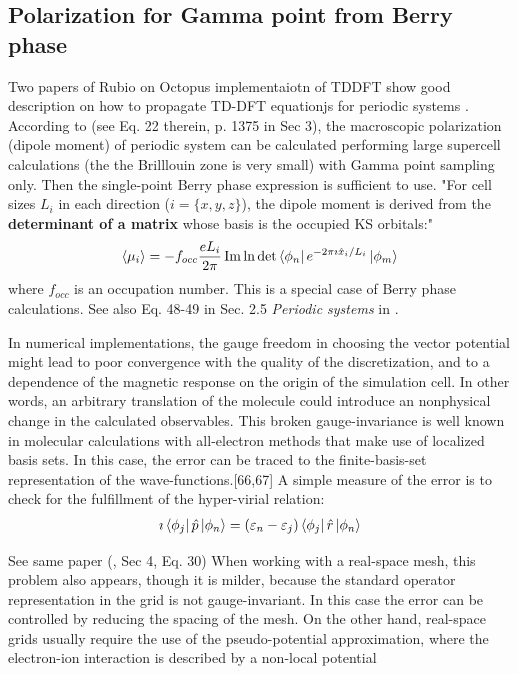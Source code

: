 \documentclass[11pt]{article}
\begin{document}
\subsection{ Polarization for Gamma point from Berry phase }

Two papers of Rubio  on Octopus implementaiotn of TDDFT show good description on how to propagate TD-DFT equationjs for periodic systems \cite{octopus-rt-tddft-PCCP-2015,octopus-rt-tddft-JCP-2020}.
According to  \cite{octopus-rt-tddft-PCCP-2015}  (see Eq. 22 therein, p. 1375 in Sec 3), the macroscopic polarization (dipole moment)   of periodic system can be calculated   performing large supercell calculations (the the  Brilllouin zone is very small) with  Gamma point sampling only. Then  the single-point Berry phase expression  is sufficient to use. "For cell sizes $L_i$ in each direction ($i=\{x, y, z \}$), the dipole moment is derived from the {\bf determinant of a matrix} whose basis is the occupied KS orbitals:"
\begin{align*}
   \langle  \mu_i \rangle  = -  f_{ occ}\frac{e L_i}{2\pi} \Im \ln \det \bra{\phi_n} e^{-2\pi \imath \hat x_i/L_i}\ket {\phi_m}
\end{align*}
where $f_{occ}$ is an occupation number.
This is a special case of Berry phase calculations. See also Eq. 48-49 in  Sec. 2.5 \emph{Periodic systems} in \cite{Luber-rt-tddft}.

In numerical implementations, the gauge freedom in choosing the vector potential might lead to poor convergence with the quality of the discretization, and to a dependence of the magnetic response on the origin of the simulation cell. In other words, an arbitrary translation of the molecule could introduce an nonphysical change in the calculated observables. This broken gauge-invariance is well known in molecular calculations with all-electron methods that make use of localized basis sets. In this case, the error can be traced to the finite-basis-set representation of the wave-functions.[66,67]  A simple measure of the error is to check for the fulfillment of the hyper-virial relation: 
\begin{align*}
    \imath \bra{\phi_j} \hat p \ket{\phi_n} = (\varepsilon_n -\varepsilon_j)  \bra{\phi_j} \hat r \ket{\phi_n}
\end{align*}

See  same paper (\cite{octopus-rt-tddft-PCCP-2015}, Sec 4, Eq. 30)
When working with a real-space mesh, this problem also
appears, though it is milder, because the standard operator representation in the grid is not gauge-invariant. In this case the error can be controlled by reducing the spacing of the mesh. On the other hand, real-space grids usually require the use of the pseudo-potential approximation, where the electron-ion interaction is described by a non-local potential
\end{document}
